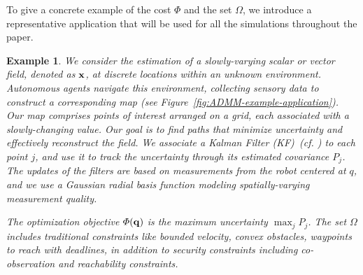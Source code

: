 \documentclass[journal]{IEEEtran}  %
\newtheorem{example}{Example}
\begin{document}
To give a concrete example of the cost $\varPhi$ and the set $\Omega$, we introduce a representative application that will be used for all the simulations throughout the paper.

\begin{example} 
We consider the estimation of a slowly-varying scalar or vector field, denoted as $\mathbf{x}$, at discrete locations within an unknown environment. Autonomous agents navigate this environment, collecting sensory data to construct a corresponding map (see Figure~\ref{fig:ADMM-example-application}). Our map comprises points of interest arranged on a grid, each associated with a slowly-changing value. Our goal is to find paths that minimize uncertainty and effectively reconstruct the field. 
We associate a Kalman Filter (KF)~(cf. \cite{anderson2012optimal}) to each point $j$, and use it to track the uncertainty through its estimated covariance $P_j$. The updates of the filters are based on measurements from the robot centered at $q$, and we use a Gaussian radial basis function  modeling spatially-varying measurement quality.



The optimization objective $\varPhi(\mathbf{q})$ is the maximum uncertainty $\max_j P_{j}$. The set $\Omega$ includes traditional constraints like bounded velocity, convex obstacles, waypoints to reach with deadlines, in addition to security constraints including co-observation and reachability constraints.
\end{example}
\end{document}
